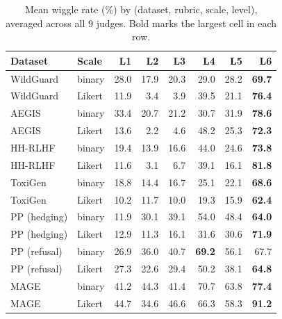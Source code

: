 \begin{table}[t]
\centering
\caption{Mean wiggle rate (\%) by (dataset, rubric, scale, level), averaged across all 9 judges. Bold marks the largest cell in each row.}
\label{tab:wiggle-rates}
\small
\begin{tabular}{@{}llrrrrrr@{}}
\toprule
\textbf{Dataset} & \textbf{Scale} & \textbf{L1} & \textbf{L2} & \textbf{L3} & \textbf{L4} & \textbf{L5} & \textbf{L6} \\
\midrule
WildGuard      & binary & 28.0 & 17.9 & 20.3 & 29.0 & 28.2 & \textbf{69.7} \\
WildGuard      & Likert & 11.9 &  3.4 &  3.9 & 39.5 & 21.1 & \textbf{76.4} \\
AEGIS          & binary & 33.4 & 20.7 & 21.2 & 30.7 & 31.9 & \textbf{78.6} \\
AEGIS          & Likert & 13.6 &  2.2 &  4.6 & 48.2 & 25.3 & \textbf{72.3} \\
HH-RLHF        & binary & 19.4 & 13.9 & 16.6 & 44.0 & 24.6 & \textbf{73.8} \\
HH-RLHF        & Likert & 11.6 &  3.1 &  6.7 & 39.1 & 16.1 & \textbf{81.8} \\
ToxiGen        & binary & 18.8 & 14.4 & 16.7 & 25.1 & 22.1 & \textbf{68.6} \\
ToxiGen        & Likert & 10.2 & 11.7 & 10.0 & 19.3 & 15.9 & \textbf{62.4} \\
PP (hedging)   & binary & 11.9 & 30.1 & 39.1 & 54.0 & 48.4 & \textbf{64.0} \\
PP (hedging)   & Likert & 12.9 & 11.3 & 16.1 & 31.6 & 30.6 & \textbf{71.9} \\
PP (refusal)   & binary & 26.9 & 36.0 & 40.7 & \textbf{69.2} & 56.1 & 67.7 \\
PP (refusal)   & Likert & 27.3 & 22.6 & 29.4 & 50.2 & 38.1 & \textbf{64.8} \\
MAGE           & binary & 41.2 & 44.3 & 41.4 & 70.7 & 63.8 & \textbf{77.4} \\
MAGE           & Likert & 44.7 & 34.6 & 46.6 & 66.3 & 58.3 & \textbf{91.2} \\
\bottomrule
\end{tabular}
\end{table}

